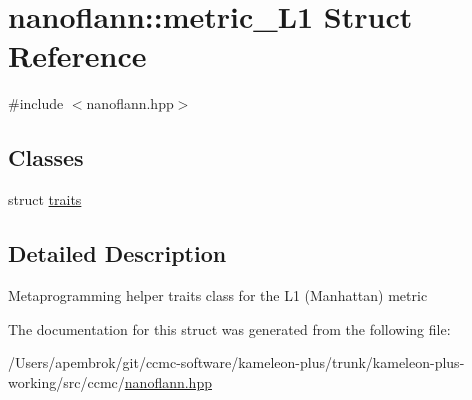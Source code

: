 \hypertarget{structnanoflann_1_1metric___l1}{\section{nanoflann\-:\-:metric\-\_\-\-L1 Struct Reference}
\label{structnanoflann_1_1metric___l1}
}


{\ttfamily \#include $<$nanoflann.\-hpp$>$}

\subsection*{Classes}
\begin{DoxyCompactItemize}
\item 
struct \hyperlink{structnanoflann_1_1metric___l1_1_1traits}{traits}
\end{DoxyCompactItemize}


\subsection{Detailed Description}
Metaprogramming helper traits class for the L1 (Manhattan) metric 

The documentation for this struct was generated from the following file\-:\begin{DoxyCompactItemize}
\item 
/\-Users/apembrok/git/ccmc-\/software/kameleon-\/plus/trunk/kameleon-\/plus-\/working/src/ccmc/\hyperlink{nanoflann_8hpp}{nanoflann.\-hpp}\end{DoxyCompactItemize}
